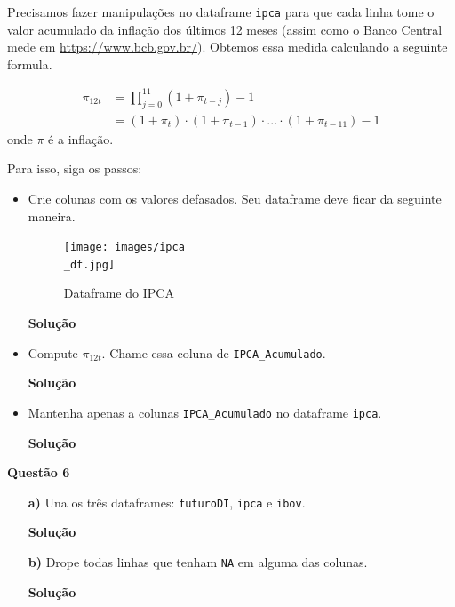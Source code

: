 \documentclass[12pt, a4paper]{article}
\begin{document}
Precisamos fazer manipulações no dataframe \texttt{ipca} para que cada linha tome o valor acumulado da inflação dos últimos 12 meses (assim como o Banco Central mede em \url{https://www.bcb.gov.br/}). Obtemos essa medida calculando a seguinte formula.

\begin{align*}
	\pi_{12t} &= \prod_{j=0}^{11} (1+\pi_{t-j}) - 1\\
	&= (1+\pi_t)\cdot (1+\pi_{t-1})\cdot ... \cdot (1+\pi_{t-11}) - 1
\end{align*}
onde $\pi$ é a inflação.

Para isso, siga os passos:

\begin{itemize}
	\item Crie colunas com os valores defasados. Seu dataframe deve ficar da seguinte maneira.
	
	\begin{figure}[H]
		\caption{Dataframe do IPCA}
		\centering
		\texttt{[image: images/ipca\\\_df.jpg]}
	\end{figure}

	

	\textbf{Solução}
	
	
	
	
	
	\item Compute $\pi_{12t}$. Chame essa coluna de \texttt{IPCA\_Acumulado}.
	
	
	
	\textbf{Solução}
	
	
	
	
	
	\item Mantenha apenas a colunas \texttt{IPCA\_Acumulado} no dataframe \texttt{ipca}.
	
	
	\textbf{Solução}
	
	
	
	
	
\end{itemize}



\textbf{Questão 6}

\begin{itemize}
	\item[\textbf{a)}] Una os três dataframes: \texttt{futuroDI}, \texttt{ipca} e \texttt{ibov}.
	
	
	
	\textbf{Solução}
	
	
	
	
	
	\item[\textbf{b)}] Drope todas linhas que tenham \texttt{NA} em alguma das colunas.
	
	
	
	\textbf{Solução}
	
	
	
	
	
\end{itemize}
\end{document}
